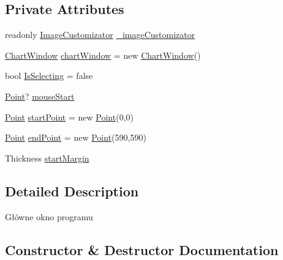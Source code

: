 \subsection*{Private Attributes}
\begin{DoxyCompactItemize}
\item 
readonly \mbox{\hyperlink{class_grafika_proj_1_1_image_customizator}{Image\+Customizator}} \mbox{\hyperlink{class_grafika_proj_1_1_main_window_a82253cbf931b7474d0612bbb8406612a}{\+\_\+image\+Customizator}}
\item 
\mbox{\hyperlink{class_grafika_proj_1_1_chart_window}{Chart\+Window}} \mbox{\hyperlink{class_grafika_proj_1_1_main_window_a540f54fa7bfa520e1ba83e97670c362b}{chart\+Window}} = new \mbox{\hyperlink{class_grafika_proj_1_1_chart_window}{Chart\+Window}}()
\item 
bool \mbox{\hyperlink{class_grafika_proj_1_1_main_window_a17347592f302b3ce2b6a1367903406e6}{Is\+Selecting}} = false
\item 
\mbox{\hyperlink{_main_window_8xaml_8cs_af7183cff3a6e75db2170da28384d7419}{Point}}? \mbox{\hyperlink{class_grafika_proj_1_1_main_window_a9cba39066f4e29a6f6e629d8b89dfcc4}{mouse\+Start}}
\item 
\mbox{\hyperlink{_main_window_8xaml_8cs_af7183cff3a6e75db2170da28384d7419}{Point}} \mbox{\hyperlink{class_grafika_proj_1_1_main_window_a8f69f3a3c8a976ea669d2cbbeff7acfa}{start\+Point}} = new \mbox{\hyperlink{_main_window_8xaml_8cs_af7183cff3a6e75db2170da28384d7419}{Point}}(0,0)
\item 
\mbox{\hyperlink{_main_window_8xaml_8cs_af7183cff3a6e75db2170da28384d7419}{Point}} \mbox{\hyperlink{class_grafika_proj_1_1_main_window_a18572e2c995fd57f4d10443aa479f444}{end\+Point}} = new \mbox{\hyperlink{_main_window_8xaml_8cs_af7183cff3a6e75db2170da28384d7419}{Point}}(590,590)
\item 
Thickness \mbox{\hyperlink{class_grafika_proj_1_1_main_window_a41a4fdf85f2929739a00381022cfd252}{start\+Margin}}
\end{DoxyCompactItemize}


\subsection{Detailed Description}
Główne okno programu 



\subsection{Constructor \& Destructor Documentation}
\mbox{\label{class_grafika_proj_1_1_main_window_a50e09c074337ab658c05dd6f7c0378b1}} 
